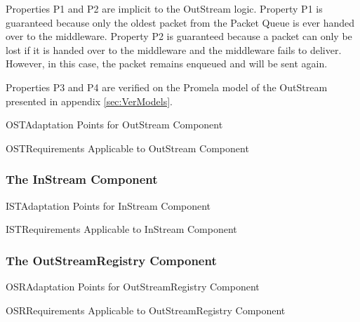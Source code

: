 \documentclass{pnp_article}
\begin{document}
Properties P1 and P2 are implicit to the OutStream logic. Property P1 is guaranteed because only the oldest packet from the Packet Queue is ever handed over to the middleware. Property P2 is guaranteed because a packet can only be lost if it is handed over to the middleware and the middleware fails to deliver. However, in this case, the packet remains enqueued and will be sent again.

Properties P3 and P4 are verified on the Promela model of the OutStream presented in appendix \ref{sec:VerModels}. 

\begin{crAp}{OST}{Adaptation Points for OutStream Component}
\end{crAp}

\begin{crReq}{OST}{Requirements Applicable to OutStream Component}
\end{crReq}

\subsubsection{The InStream Component}\label{sec:InStream}


\begin{crAp}{IST}{Adaptation Points for InStream Component}
\end{crAp}


\begin{crReq}{IST}{Requirements Applicable to InStream Component}
\end{crReq}

\subsubsection{The OutStreamRegistry Component}\label{sec:OutStreamRegistry}


\begin{crAp}{OSR}{Adaptation Points for OutStreamRegistry Component}
\end{crAp}

\begin{crReq}{OSR}{Requirements Applicable to OutStreamRegistry Component}
\end{crReq}



\end{document}
